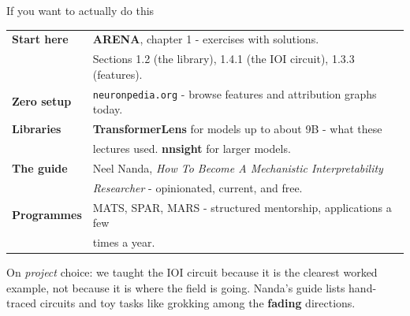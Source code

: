 \documentclass[aspectratio=169]{beamer}
\newcommand{\watchbox}[1]{%
  \begin{tcolorbox}[colback=armorange!12, colframe=armorange, boxrule=0.6pt, arc=2pt]
  #1
  \end{tcolorbox}}
\begin{document}
\begin{frame}{If you want to actually do this}
  \vspace{0.5em}
  \begin{center}
  \small
  \begin{tabular}{@{}ll@{}}
    \toprule
    \textbf{Start here} & \textbf{ARENA}, chapter 1 - exercises with solutions.\\
      & Sections 1.2 (the library), 1.4.1 (the IOI circuit), 1.3.3 (features).\\[0.5em]
    \textbf{Zero setup} & \texttt{neuronpedia.org} - browse features and attribution graphs today.\\[0.5em]
    \textbf{Libraries} & \textbf{TransformerLens} for models up to about 9B - what these\\
      & lectures used. \textbf{nnsight} for larger models.\\[0.5em]
    \textbf{The guide} & Neel Nanda, \emph{How To Become A Mechanistic Interpretability}\\
      & \emph{Researcher} - opinionated, current, and free.\\[0.5em]
    \textbf{Programmes} & MATS, SPAR, MARS - structured mentorship, applications a few\\
      & times a year.\\
    \bottomrule
  \end{tabular}
  \end{center}

  \vspace{0.3em}
  \watchbox{\small On \emph{project} choice: we taught the IOI circuit because it is the
  clearest worked example, not because it is where the field is going. Nanda's guide lists
  hand-traced circuits and toy tasks like grokking among the \textbf{fading} directions.}
\end{frame}
\end{document}
